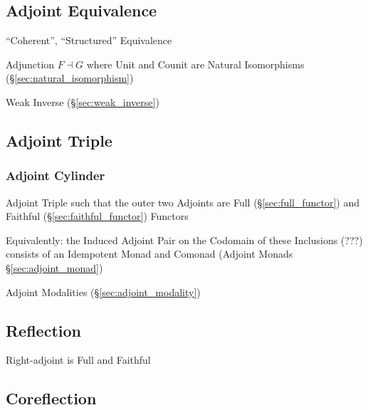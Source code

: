 \subsection{Adjoint Equivalence}\label{sec:adjoint_equivalence}

``Coherent'', ``Structured'' Equivalence

Adjunction $F \dashv G$ where Unit and Counit are Natural Isomorphisms
(\S\ref{sec:natural_isomorphism})

Weak Inverse (\S\ref{sec:weak_inverse})



\subsection{Adjoint Triple}\label{sec:adjoint_triple}

\subsubsection{Adjoint Cylinder}\label{sec:adjoint_cylinder}

Adjoint Triple such that the outer two Adjoints are Full
(\S\ref{sec:full_functor}) and Faithful (\S\ref{sec:faithful_functor})
Functors

Equivalently: the Induced Adjoint Pair on the Codomain of these
Inclusions (???) consists of an Idempotent Monad and Comonad (Adjoint
Monads \S\ref{sec:adjoint_monad})

Adjoint Modalities (\S\ref{sec:adjoint_modality})



\subsection{Reflection}\label{sec:reflection_adjunction}

\cite{winskel-nielsen93}

Right-adjoint is Full and Faithful



\subsection{Coreflection}\label{sec:coreflection_adjunction}

